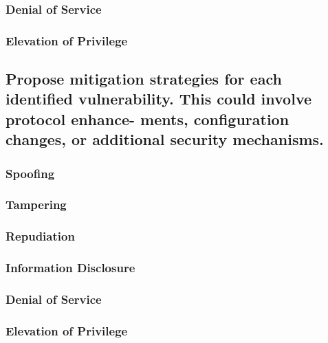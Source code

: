 \documentclass{article}
\begin{document}
\subsubsection{Denial of Service}

\subsubsection{Elevation of Privilege}

\subsection{Propose mitigation strategies for each identified vulnerability. This could involve protocol enhance-
ments, configuration changes, or additional security mechanisms.}

\subsubsection{Spoofing}

\subsubsection{Tampering}

\subsubsection{Repudiation}

\subsubsection{Information Disclosure}

\subsubsection{Denial of Service}

\subsubsection{Elevation of Privilege}
\end{document}
